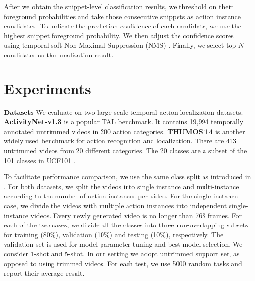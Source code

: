 \documentclass{bmvc2k}
\begin{document}
After we obtain the snippet-level classification results,
we threshold on their {foreground probabilities}
and take those consecutive snippets as action instance candidates. 
To indicate the prediction confidence of each candidate,
we use the highest snippet foreground probability.
We then adjust the confidence scores using temporal soft Non-Maximal Suppression (NMS) \cite{bodla2017soft,lin2019bmn}. Finally, we select top $N$ candidates as the localization result.
\vspace{-0.3in}
\section{Experiments}
\label{sec:experiments}

{\bf Datasets}
We evaluate on two large-scale temporal action localization datasets. \textbf{ActivityNet-v1.3} \cite{caba2015activitynet} is a popular TAL benchmark.
It contains 19,994 temporally annotated untrimmed videos in 200 action categories. \textbf{THUMOS'14} \cite{jiang2014thumos} is another
widely used benchmark for action recognition and localization. There are 413 untrimmed videos from 20 different categories. 
The 20 classes are a subset of the 101 classes in UCF101 \cite{soomro2012ucf101}. 






To facilitate performance comparison, we use the same class split as introduced in  \cite{yang2020localizing}.
For both datasets, we split the videos into single instance and multi-instance according to the number of action instances per video. 
For the single instance case, we divide the videos with multiple action instances into independent single-instance videos. Every newly generated video is no longer than 768 frames. 
For each of the two cases, we divide all the classes into three non-overlapping subsets for training (80\%), validation (10\%) and testing (10\%), respectively. The validation set is used for model parameter tuning and 
best model selection. We consider 1-shot and 5-shot.
In our setting we adopt untrimmed support set, 
as opposed to \cite{yang2020localizing} using trimmed videos. For each test, we use 5000 random tasks and report their average result.
\end{document}
